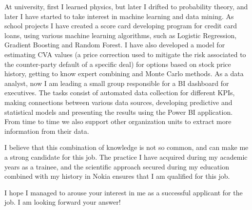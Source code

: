 \documentclass[11pt,a4paper,sans,english]{moderncv}        %
\begin{document}
At university, first I learned physics, but later I drifted to probability theory, and later I have started to take interest in machine learning and data mining. As school projects I have created a score card developing program for credit card loans, using various machine learning algorithms, such as Logistic Regression, Gradient Boosting and Random Forest. I have also developed a model for estimating CVA values (a price correction used to mitigate the risk associated to the counter-party default of a specific deal) for options based on stock price history, getting to know expert combining and Monte Carlo methods. As a data analyst, now I am leading a small group responsible for a BI dashboard for executives. The tasks consist of automated data collection for different KPIs, making connections between various data sources, developing predictive and statistical models and presenting the results using the Power BI application. From time to time we also support other organization units to extract more information from their data.

I believe that this combination of knowledge is not so common, and can make me a strong candidate for this job. The practice I have acquired during my academic years as a trainee, and the scientific approach secured during my education combined with my history in Nokia ensures that I am qualified for this job.

I hope I managed to arouse your interest in me as a successful applicant for the job. I am looking forward your answer!

\makeletterclosing
\end{document}
